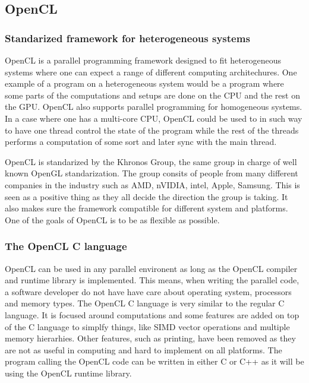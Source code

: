 \subsection{OpenCL}

\subsubsection{Standarized framework for heterogeneous systems}

OpenCL is a parallel programming framework designed to fit heterogeneous systems where one can expect a range of different computing architechures. One example of a program on a heterogeneous system would be a program where some parts of the computations and setups are done on the CPU and the rest on the GPU. OpenCL also supports parallel programming for homogeneous systems. In a case where one has a multi-core CPU, OpenCL could be used to in such way to have one thread control the state of the program while the rest of the threads performs a computation of some sort and later sync with the main thread.
\newline

OpenCL is standarized by the Khronos Group, the same group in charge of well known OpenGL standarization. The group consits of people from many different companies in the industry such as AMD, nVIDIA, intel, Apple, Samsung. This is seen as a positive thing as they all decide the direction the group is taking. It also makes sure the framework compatible for different system and platforms. One of the goals of OpenCL is to be as flexible as possible.
\newline

\subsubsection{The OpenCL C language}
OpenCL can be used in any parallel environent as long as the OpenCL compiler and runtime library is implemented. This means, when writing the parallel code, a software developer do not have have care about operating system, processors and memory types. The OpenCL C language is very similar to the regular C language. It is focused around computations and some features are added on top of the C language to simplfy things, like SIMD vector operations and multiple memory hierarhies. Other features, such as printing, have been removed as they are not as useful in computing and hard to implement on all platforms. The program calling the OpenCL code can be written in either C or C++ as it will be using the OpenCL runtime library. 
\newline

